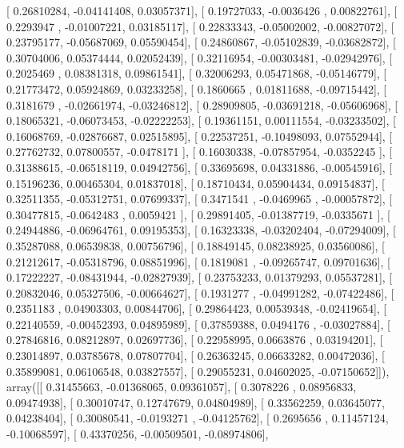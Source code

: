 \documentclass{article}
\begin{document}
       [ 0.26810284, -0.04141408,  0.03057371],
       [ 0.19727033, -0.0036426 ,  0.00822761],
       [ 0.2293947 , -0.01007221,  0.03185117],
       [ 0.22833343, -0.05002002, -0.00827072],
       [ 0.23795177, -0.05687069,  0.05590454],
       [ 0.24860867, -0.05102839, -0.03682872],
       [ 0.30704006,  0.05374444,  0.02052439],
       [ 0.32116954, -0.00303481, -0.02942976],
       [ 0.2025469 ,  0.08381318,  0.09861541],
       [ 0.32006293,  0.05471868, -0.05146779],
       [ 0.21773472,  0.05924869,  0.03233258],
       [ 0.1860665 ,  0.01811688, -0.09715442],
       [ 0.3181679 , -0.02661974, -0.03246812],
       [ 0.28909805, -0.03691218, -0.05606968],
       [ 0.18065321, -0.06073453, -0.02222253],
       [ 0.19361151,  0.00111554, -0.03233502],
       [ 0.16068769, -0.02876687,  0.02515895],
       [ 0.22537251, -0.10498093,  0.07552944],
       [ 0.27762732,  0.07800557, -0.0478171 ],
       [ 0.16030338, -0.07857954, -0.0352245 ],
       [ 0.31388615, -0.06518119,  0.04942756],
       [ 0.33695698,  0.04331886, -0.00545916],
       [ 0.15196236,  0.00465304,  0.01837018],
       [ 0.18710434,  0.05904434,  0.09154837],
       [ 0.32511355, -0.05312751,  0.07699337],
       [ 0.3471541 , -0.0469965 , -0.00057872],
       [ 0.30477815, -0.0642483 ,  0.0059421 ],
       [ 0.29891405, -0.01387719, -0.0335671 ],
       [ 0.24944886, -0.06964761,  0.09195353],
       [ 0.16323338, -0.03202404, -0.07294009],
       [ 0.35287088,  0.06539838,  0.00756796],
       [ 0.18849145,  0.08238925,  0.03560086],
       [ 0.21212617, -0.05318796,  0.08851996],
       [ 0.1819081 , -0.09265747,  0.09701636],
       [ 0.17222227, -0.08431944, -0.02827939],
       [ 0.23753233,  0.01379293,  0.05537281],
       [ 0.20832046,  0.05327506, -0.00664627],
       [ 0.1931277 , -0.04991282, -0.07422486],
       [ 0.2351183 ,  0.04903303,  0.00844706],
       [ 0.29864423,  0.00539348, -0.02419654],
       [ 0.22140559, -0.00452393,  0.04895989],
       [ 0.37859388,  0.0494176 , -0.03027884],
       [ 0.27846816,  0.08212897,  0.02697736],
       [ 0.22958995,  0.0663876 ,  0.03194201],
       [ 0.23014897,  0.03785678,  0.07807704],
       [ 0.26363245,  0.06633282,  0.00472036],
       [ 0.35899081,  0.06106548,  0.03827557],
       [ 0.29055231,  0.04602025, -0.07150652]]), array([[ 0.31455663, -0.01368065,  0.09361057],
       [ 0.3078226 ,  0.08956833,  0.09474938],
       [ 0.30010747,  0.12747679,  0.04804989],
       [ 0.33562259,  0.03645077,  0.04238404],
       [ 0.30080541, -0.0193271 , -0.04125762],
       [ 0.2695656 ,  0.11457124, -0.10068597],
       [ 0.43370256, -0.00509501, -0.08974806],
\end{document}
